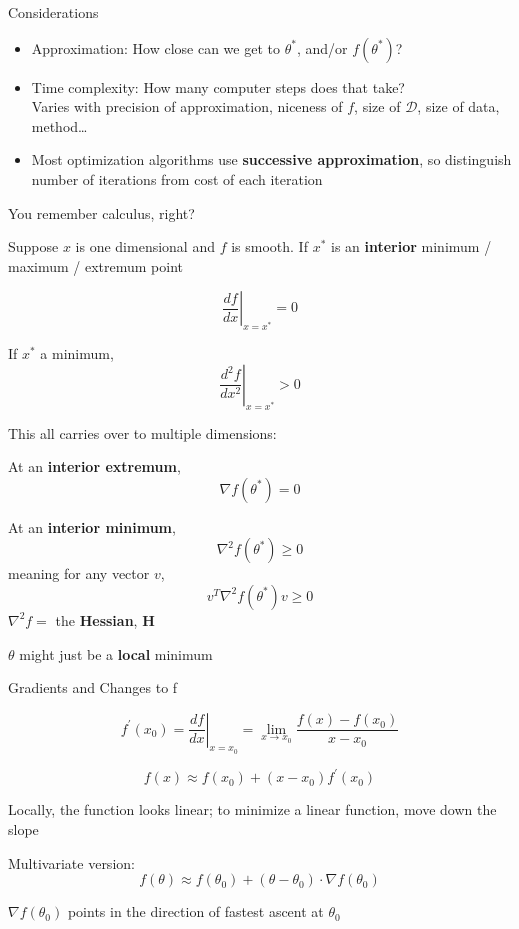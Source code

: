 \documentclass[8pt,ignorenonframetext,]{beamer}
\begin{document}
\begin{frame}{Considerations}

\begin{itemize}
\item
  Approximation: How close can we get to \(\theta^*\), and/or
  \(f(\theta^*)\)?
\item
  Time complexity: How many computer steps does that take?\\
  Varies with precision of approximation, niceness of \(f\), size of
  \(\mathcal{D}\), size of data, method\ldots{}
\item
  Most optimization algorithms use \textbf{successive approximation}, so
  distinguish number of iterations from cost of each iteration
\end{itemize}

\end{frame}

\begin{frame}{You remember calculus, right?}

Suppose \(x\) is one dimensional and \(f\) is smooth. If \(x^*\) is an
\textbf{interior} minimum / maximum / extremum point

\[
{\left. \frac{df}{dx} \right|}_{x=x^*} = 0
\]

If \(x^*\) a minimum, \[
{\left. \frac{d^2f}{dx^2}\right|}_{x=x^*} > 0
\]

\end{frame}

\begin{frame}

This all carries over to multiple dimensions:

At an \textbf{interior extremum}, \[
\nabla f(\theta^*) = 0
\]

At an \textbf{interior minimum}, \[
\nabla^2 f(\theta^*) \geq 0
\] meaning for any vector \(v\), \[
v^T \nabla^2 f(\theta^*) v \geq 0
\] \(\nabla^2 f =\) the \textbf{Hessian}, \(\mathbf{H}\)

\(\theta\) might just be a \textbf{local} minimum

\end{frame}

\begin{frame}{Gradients and Changes to f}

\[
f^{\prime}(x_0)  =  {\left. \frac{df}{dx}\right|}_{x=x_0} = \lim_{x\rightarrow x_0}{\frac{f(x)-f(x_0)}{x-x_0}} \]

\[    f(x)  \approx f(x_0) +(x-x_0)f^{\prime}(x_0)
\]

Locally, the function looks linear; to minimize a linear function, move
down the slope

Multivariate version: \[
f(\theta) \approx f(\theta_0) + (\theta-\theta_0) \cdot \nabla f(\theta_0)
\]

\(\nabla f(\theta_0)\) points in the direction of fastest ascent at
\(\theta_0\)

\end{frame}
\end{document}
